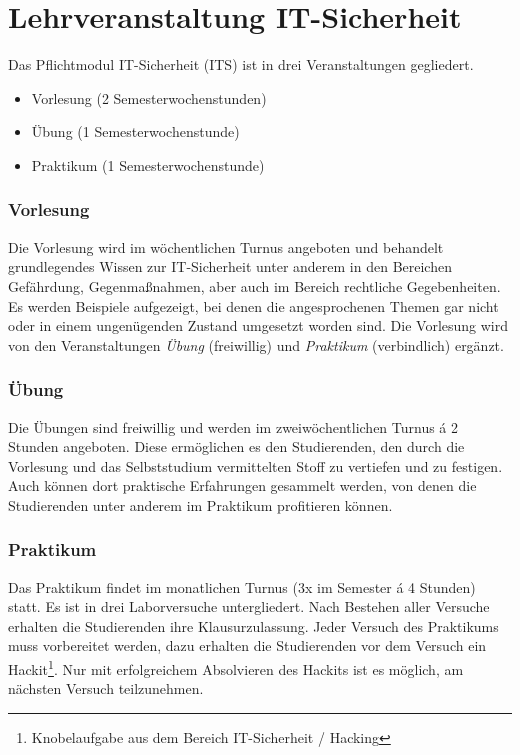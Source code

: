 \section{Lehrveranstaltung IT-Sicherheit} \label{sec:Lehrveranstaltung_IT-Sicherheit}

Das Pflichtmodul IT-Sicherheit (ITS) ist in drei Veranstaltungen gegliedert.\cite[S.30]{hochschuleniederrheinModulhandbuchVollzeitBA2019}
\begin{itemize}
	\item Vorlesung (2 Semesterwochenstunden)
	\item Übung (1 Semesterwochenstunde)
	\item Praktikum (1 Semesterwochenstunde)
\end{itemize}

\subsubsection{Vorlesung}
Die Vorlesung wird im wöchentlichen Turnus angeboten und behandelt grundlegendes Wissen zur IT-Sicherheit unter anderem in den Bereichen Gefährdung, Gegenmaßnahmen, aber auch im Bereich rechtliche Gegebenheiten. Es werden Beispiele aufgezeigt, bei denen die angesprochenen Themen gar nicht oder in einem ungenügenden Zustand umgesetzt worden sind. Die Vorlesung wird von den Veranstaltungen \textit{Übung} (freiwillig) und \textit{Praktikum} (verbindlich) ergänzt.

\subsubsection{Übung}
Die Übungen sind freiwillig und werden im zweiwöchentlichen Turnus á 2 Stunden angeboten. Diese ermöglichen es den Studierenden, den durch die Vorlesung und das Selbststudium vermittelten Stoff zu vertiefen und zu festigen. Auch können dort praktische Erfahrungen gesammelt werden, von denen die Studierenden unter anderem im Praktikum profitieren können.

\subsubsection{Praktikum}
Das Praktikum findet im monatlichen Turnus (3x im Semester á 4 Stunden) statt. Es ist in drei Laborversuche untergliedert. Nach Bestehen aller Versuche erhalten die Studierenden ihre Klausurzulassung. Jeder Versuch des Praktikums muss vorbereitet werden, dazu erhalten die Studierenden vor dem Versuch ein Hackit\footnote{Knobelaufgabe aus dem Bereich IT-Sicherheit / Hacking}. Nur mit erfolgreichem Absolvieren des Hackits ist es möglich, am nächsten Versuch teilzunehmen.\cite{quadePraktikumITSecurity2017}